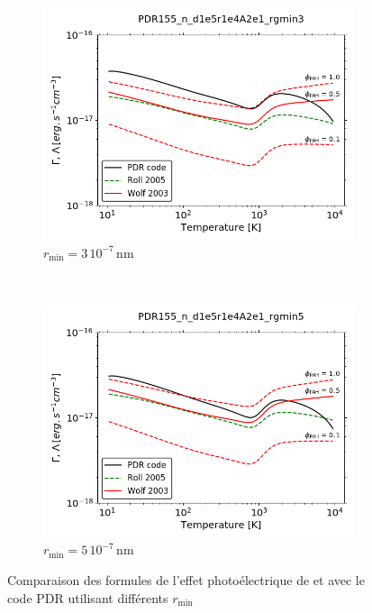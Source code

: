 \begin{figure}[!h]
    \centering
    \begin{subfigure}[t]{0.45\textwidth} %
        \centering \includegraphics[trim = {0 0 0 1cm},clip,width=1\textwidth]{figure/Cl/pePAH/pe_formulae_rgmin3.png}
        \caption{$r_\mathrm{min} = 3\,10^{-7} \, \mathrm{nm}$}
    \end{subfigure}
    ~ 
   \begin{subfigure}[t]{0.45\textwidth} %
        \centering \includegraphics[trim = {0 0 0 1cm},clip,width=1\textwidth]{figure/Cl/pePAH/pe_formulae_rgmin5.png}
        \caption{$r_\mathrm{min} = 5\,10^{-7}\, \mathrm{nm}$}
    \end{subfigure}
    \caption{Comparaison des formules de l'effet photoélectrique de \cite{Rollig2005} et \cite{Wolfire_2003} avec le code PDR utilisant différents $r_\mathrm{min}$}
    \label{fig:Cl:pePAH}
\end{figure}

